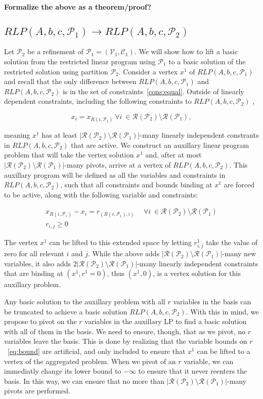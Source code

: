 \documentclass[runningheads]{llncs}
\newcommand{\cP}{{\mathcal P}}
\newcommand{\cC}{{\mathcal C}}
\newcommand{\cV}{{\mathcal V}}
\newcommand{\cR}{{\mathcal R}}
\begin{document}
{\bf Formalize the above as a theorem/proof?}


\subsection{$RLP(A,b,c,\cP_1) \rightarrow RLP(A,b,c,\cP_2)$}


Let $\cP_2$ be a refinement of $\cP_1 = (\cV_1, \cC_1)$. We will show how to lift a basic solution from the restricted linear program using $\cP_1$ to a basic solution of the restricted solution using partition $\cP_2$. Consider a vertex $x^1$ of $RLP(A,b,c,\cP_1)$ and recall that the only difference between $RLP(A,b,c,\cP_1)$ and $RLP(A,b,c,\cP_2)$ is in the set of constraints~\eqref{cons:equal}. Outside of linearly dependent constraints, including the following constraints to $RLP(A,b,c,\cP_2)$ ,

$$ x_i = x_{R(i,\cP_1)} \ \forall i\ \in \cR(\cP_2) \setminus \cR(\cP_1),$$

\noindent meaning $x^1$ has at least $|\cR(\cP_2) \setminus \cR(\cP_1)|$-many linearly independent constrants in $RLP(A,b,c,\cP_2)$ that are active. We construct an auxillary linear program problem that will take the vertex solution $x^1$ and, after at most $|\cR(\cP_2) \setminus \cR(\cP_1)|$-many pivots, arrive at a vertex of  $RLP(A,b,c,\cP_2)$. This auxillary program will be defined as all the variables and constraints in $RLP(A,b,c,\cP_2)$, such that all constraints and bounds binding at $x^1$ are forced to be active, along with the following variable and constraints:

\begin{align}
x_{R(i,\cP_1)}  - x_i = r_{(R(i,\cP_1), i) } &\ \  \forall i\ \in \cR(\cP_2) \setminus \cR(\cP_1) \label{eq:linking}\\
r_{i,j} \geq 0 \label{eq:bound}
\end{align}

\noindent The vertex $x^1$ can be lifted to this extended space by letting $r_{i,j}^1$ take the value of zero for all relevant $i$ and $j$. While the above adds $|\cR(\cP_2) \setminus \cR(\cP_1)|$-many new variables, it also adds $2|\cR(\cP_2) \setminus \cR(\cP_1)|$-many linearly independent constraints that are binding at $(x^1,r^1=0)$, thus $(x^1,0)$, is a vertex solution for this auxillary problem.  


Any basic solution to the auxillary problem with all $r$ variables in the basis can be truncated to achieve a basic solution $RLP(A,b,c,\cP_2)$. With this in mind, we propose to pivot on the $r$ variables in the auxillary LP to find a basic solution with all of them in the basis. We need to ensure, though, that as we pivot, no $r$ variables leave the basis. This is done by realizing that the variable bounds on $r$~\eqref{eq:bound} are artificial, and only included to ensure that $x^1$ can be lifted to a vertex of the aggregated problem. When we pivot of an $r$ variable, we can immediatly change its lower bound to $-\infty$ to ensure that it never reenters the basis. In this way, we can ensure that no more than $|\cR(\cP_2) \setminus \cR(\cP_1)|$-many pivots are performed. 
\end{document}

